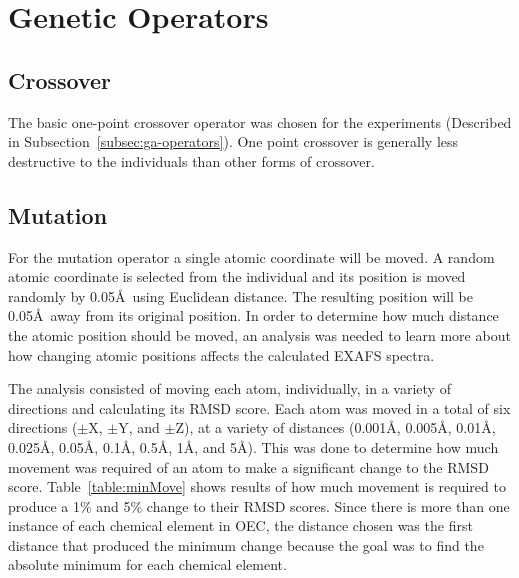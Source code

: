 \section{Genetic Operators}
\label{sec:ga-operators}

\subsection{Crossover}

The basic one-point crossover operator was chosen for the experiments (Described in Subsection~\ref{subsec:ga-operators}). One point crossover is generally less destructive to the individuals than other forms of crossover. %

\subsection{Mutation}
\label{subsec:mutation}

For the mutation operator a single atomic coordinate will be moved. A random atomic coordinate is selected from the individual and its position is moved randomly by 0.05\AA\  using Euclidean distance. The resulting position will be 0.05\AA\ away from its original position. In order to determine how much distance the atomic position should be moved, an analysis was needed to learn more about how changing atomic positions affects the calculated EXAFS spectra.

The analysis consisted of moving each atom, individually, in a variety of directions and calculating its RMSD score. Each atom was moved in a total of six directions ($\pm$X, $\pm$Y, and $\pm$Z), at a variety of distances (0.001\AA, 0.005\AA, 0.01\AA, 0.025\AA, 0.05\AA, 0.1\AA, 0.5\AA, 1\AA, and 5\AA). This was done to determine how much movement was required of an atom to make a significant change to the RMSD score. Table~\ref{table:minMove} shows results of how much movement is required to produce a 1\% and 5\% change to their RMSD scores. Since there is more than one instance of each chemical element in OEC, the distance chosen was the first distance that produced the minimum change because the goal was to find the absolute minimum for each chemical element.

